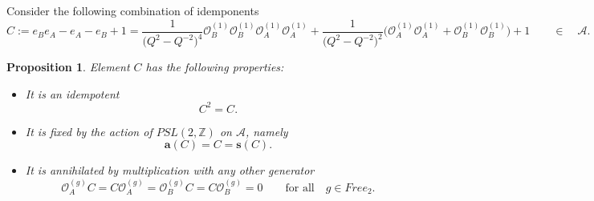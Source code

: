 \documentclass{amsart}
\newtheorem{proposition}[theorem]{Proposition}
\newcommand{\Oa}{\mathcal O_A}
\newcommand{\Ob}{\mathcal O_B}
\begin{document}
Consider the following combination of idemponents
\begin{equation*}
C:=e_Be_A-e_A-e_B+1=\frac1{\big(Q^2-Q^{-2}\big)^4}\Ob^{(1)}\Ob^{(1)}\Oa^{(1)}\Oa^{(1)}+\frac1{\big(Q^2-Q^{-2}\big)^2}\Big(\Oa^{(1)}\Oa^{(1)}+\Ob^{(1)}\Ob^{(1)}\Big)+1\qquad\in\quad\mathcal A.
\end{equation*}
\begin{proposition}
Element $C$ has the following properties:
\begin{itemize}
    \item It is an idempotent
    \begin{equation*}
    C^2=C.
    \end{equation*}
    \item It is fixed by the action of $PSL(2,\mathbb Z)$ on $\mathcal A$, namely
    \begin{equation*}
        \mathbf a(C)=C=\mathbf s(C).
    \end{equation*}
    \item It is annihilated by multiplication with any other generator
    \begin{equation*}
        \Oa^{(g)}C=C\Oa^{(g)}=\Ob^{(g)}C=C\Ob^{(g)}=0\qquad\textrm{for all}\quad g\in Free_2.
    \end{equation*}
\end{itemize}
\end{proposition}
\end{document}
